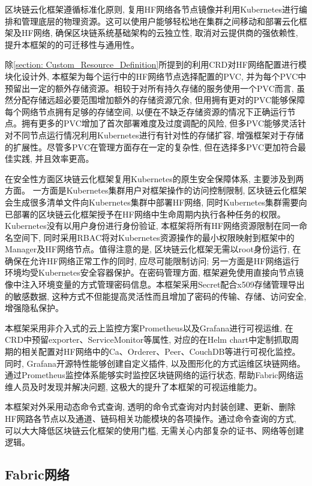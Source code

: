 区块链云化框架遵循标准化原则, 复用HF网络各节点镜像并利用Kubernetes进行编排和管理底层的物理资源。这可以使用户能够轻松地在集群之间移动和部署云化框架及HF网络, 确保区块链系统基础架构的云独立性, 取消对云提供商的强依赖性, 提升本框架的的可迁移性与通用性。

除\ref{section: Custom_Resource_Definition}所提到的利用CRD对HF网络配置进行模块化设计外, 本框架为每个运行中的HF网络节点选择配置的PVC, 并为每个PVC中预留出一定的额外存储资源。相较于对所有持久存储的服务使用一个PVC而言, 虽然分配存储远超必要范围增加额外的存储资源冗余, 但用拥有更对的PVC能够保障每个网络节点拥有足够的存储空间, 以便在不缺乏存储资源的情况下正确运行节点。拥有更多的PVC增加了首次部署难度及过度调配的风险, 但多PVC能够灵活针对不同节点运行情况利用Kubernetes进行有针对性的存储扩容, 增强框架对于存储的扩展性。尽管多PVC在管理方面存在一定的复杂性, 但在选择多PVC更加符合最佳实践, 并且效率更高\cite{d2020design}。

在安全性方面区块链云化框架复用Kubernetes的原生安全保障体系, 主要涉及到两方面。 一方面是Kubernetes集群用户对框架操作的访问控制限制, 区块链云化框架会生成很多清单文件向Kubernetes集群中部署HF网络, 同时Kubernetes集群需要向已部署的区块链云化框架授予在HF网络中生命周期内执行各种任务的权限。Kubernetes没有以用户身份进行身份验证, 本框架将所有HF网络资源限制在同一命名空间下, 同时采用RBAC将对Kubernetes资源操作的最小权限映射到框架中的Manager及HF网络节点。值得注意的是, 区块链云化框架无需以root身份运行, 在确保在允许HF网络正常工作的同时, 应尽可能限制访问; 另一方面是HF网络运行环境均受Kubernetes安全容器保护。在密码管理方面, 框架避免使用直接向节点镜像中注入环境变量的方式管理密码信息。本框架采用Secret配合x509\cite{8249485}存储管理导出的敏感数据, 这种方式不但能提高灵活性而且增加了密码的传输、存储、访问安全, 增强隐私保护。


本框架采用非介入式的云上监控方案Prometheus以及Grafana进行可视运维, 在CRD中预留exporter、ServiceMonitor等属性, 对应的在Helm chart中定制抓取周期的相关配置对HF网络中的Ca、Orderer、Peer、CouchDB等进行可视化监控。同时, Grafana开源特性能够创建自定义插件, 以及图形化的方式运维区块链网络。通过Prometheus监控体系能够实时监控区块链网络的运行状态, 帮助Fabric网络运维人员及时发现并解决问题, 这极大的提升了本框架的可视运维能力。

本框架对外采用动态命令式查询, 透明的命令式查询对内封装创建、更新、删除HF网路各节点以及通道、链码相关功能模块的各项操作。通过命令查询的方式, 可以大大降低区块链云化框架的使用门槛, 无需关心内部复杂的证书、网络等创建逻辑。

\subsection{Fabric网络}

